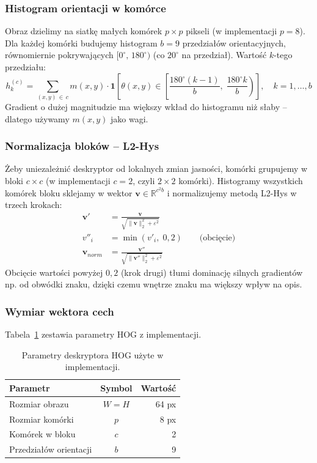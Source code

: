 \documentclass[12pt,oneside]{article}
\begin{document}
\subsubsection{Histogram orientacji w komórce}
Obraz dzielimy na siatkę małych komórek $p \times p$ pikseli (w implementacji
$p = 8$). Dla każdej komórki budujemy histogram $b = 9$ przedziałów orientacyjnych,
równomiernie pokrywających $[0^\circ,\,180^\circ)$ (co $20^\circ$ na przedział).
Wartość $k$-tego przedziału:
\begin{equation}
    h_k^{(c)} = \sum_{(x,y)\,\in\, c} m(x,y) \cdot \mathbf{1}\!\left[
        \theta(x,y) \in \left[\frac{180^\circ(k-1)}{b},\;
        \frac{180^\circ k}{b}\right)
    \right], \quad k=1,\ldots,b
    \label{eq:hogbin}
\end{equation}
Gradient o dużej magnitudzie ma większy wkład do histogramu niż słaby -- dlatego
używamy $m(x,y)$ jako wagi.

\subsubsection{Normalizacja bloków -- L2-Hys}
Żeby uniezależnić deskryptor od lokalnych zmian jasności, komórki grupujemy w bloki
$c \times c$ (w implementacji $c = 2$, czyli $2\times2$ komórki). Histogramy
wszystkich komórek bloku sklejamy w wektor $\mathbf{v} \in \mathbb{R}^{c^2 b}$
i normalizujemy metodą L2-Hys w trzech krokach:
\begin{align}
    \mathbf{v}'      &= \frac{\mathbf{v}}{\sqrt{\|\mathbf{v}\|_2^2 + \varepsilon^2}}
    \label{eq:l2norm}\\
    v''_i            &= \min\!\left(v'_i,\; 0{,}2\right) \qquad\text{(obcięcie)}
    \label{eq:clip}\\
    \mathbf{v}_{norm}&= \frac{\mathbf{v}''}{\sqrt{\|\mathbf{v}''\|_2^2 + \varepsilon^2}}
    \label{eq:renorm}
\end{align}
Obcięcie wartości powyżej $0{,}2$ (krok drugi) tłumi dominację silnych gradientów
np. od obwódki znaku, dzięki czemu wnętrze znaku ma większy wpływ na opis.

\subsubsection{Wymiar wektora cech}
Tabela~\ref{tab:hog_params} zestawia parametry HOG z implementacji.

\begin{table}[H]
\centering
\begin{tabular}{lcr}
    \toprule
    Parametr & Symbol & Wartość \\
    \midrule
    Rozmiar obrazu        & $W = H$ & 64 px \\
    Rozmiar komórki       & $p$     & 8 px  \\
    Komórek w bloku       & $c$     & 2     \\
    Przedziałów orientacji& $b$     & 9     \\
    \bottomrule
\end{tabular}
\caption{Parametry deskryptora HOG użyte w implementacji.}
\label{tab:hog_params}
\end{table}
\end{document}
